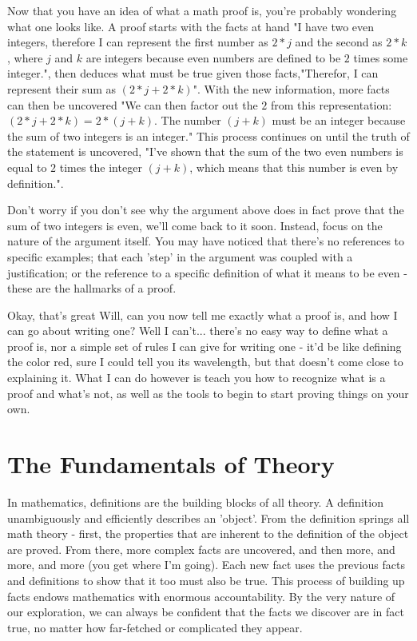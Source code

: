 \documentclass[a4paper,12pt]{article}
\begin{document}
Now that you have an idea of what a math proof is, you're probably wondering what one looks like. A proof starts with the facts at hand "I have two even integers, therefore I can represent the first number as  $2*j$ and the second as $2*k$, where $j$ and $k$ are integers because even numbers are defined to be $2$ times some integer.", then deduces what must be true given those facts,"Therefor, I can represent their sum as $(2*j + 2*k)$". With the new information, more facts can then be uncovered "We can then factor out the $2$ from this representation:  $(2*j + 2*k) = 2*(j + k)$. The number $(j + k)$ must be an integer because the sum of two integers is an integer." This process continues on until the truth of the statement is uncovered, "I've shown that the sum of the two even numbers is equal to $2$ times the integer $(j + k)$, which means that this number is even by definition.". 

Don't worry if you don't see why the argument above does in fact prove that the sum of two integers is even, we'll come back to it soon. Instead, focus on the nature of the argument itself. You may have noticed that there's no references to specific examples; that each 'step' in the argument was coupled with a justification; or the reference to a specific definition of what it means to be even - these are the hallmarks of a proof. 

Okay, that's great Will, can you now tell me exactly what a proof is, and how I can go about writing one? Well I can't... there's no easy way to define what a proof is, nor a simple set of rules I can give for writing one - it'd be like defining the color red, sure I could tell you its wavelength, but that doesn't come close to explaining it. What I can do however is teach you how to recognize what is a proof and what's not, as well as the tools to begin to start proving things on your own.

\section{The Fundamentals of Theory}
In mathematics, definitions are the building blocks of all theory. A definition unambiguously and efficiently describes an 'object'. From the definition springs all math theory - first, the properties that are inherent to the definition of the object are proved. From there, more complex facts are uncovered, and then more, and more, and more (you get where I'm going). Each new fact uses the previous facts and definitions to show that it too must also be true. This process of building up facts endows mathematics with enormous accountability. By the very nature of our exploration, we can always be confident that the facts we discover are in fact true, no matter how far-fetched or complicated they appear. 
\end{document}
